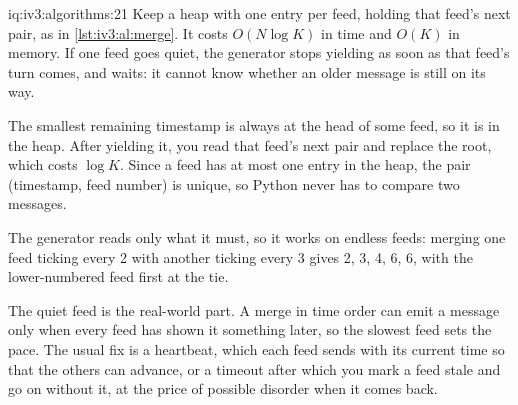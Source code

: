 \begin{solution}{iq:iv3:algorithms:21}
Keep a heap with one entry per feed, holding that feed's next pair, as in \cref{lst:iv3:al:merge}. It costs $O(N \log K)$ in time and $O(K)$ in memory. If one feed goes quiet, the generator stops yielding as soon as that feed's turn comes, and waits: it cannot know whether an older message is still on its way.
\enlargethispage{-3\baselineskip}%
\label{lst:iv3:al:merge}

The smallest remaining timestamp is always at the head of some feed, so it is in the heap. After yielding it, you read that feed's next pair and replace the root, which costs $\log K$. Since a feed has at most one entry in the heap, the pair (timestamp, feed number) is unique, so Python never has to compare two messages.

The generator reads only what it must, so it works on endless feeds: merging one feed ticking every 2 with another ticking every 3 gives 2, 3, 4, 6, 6, with the lower-numbered feed first at the tie.

The quiet feed is the real-world part. A merge in time order can emit a message only when every feed has shown it something later, so the slowest feed sets the pace. The usual fix is a heartbeat, which each feed sends with its current time so that the others can advance, or a timeout after which you mark a feed stale and go on without it, at the price of possible disorder when it comes back.

\end{solution}

